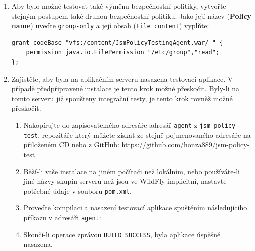 \begin{enumerate}
  \item Aby bylo možné testovat také výměnu bezpečnostní politiky, vytvořte stejným postupem také druhou bezpečnostní politiku. Jako její název ({\bf Policy name}) uveďte {\tt group-only} a její obsah ({\tt File content}) vyplňte:
  \begin{lstlisting}
grant codeBase "vfs:/content/JsmPolicyTestingAgent.war/-" {
    permission java.io.FilePermission "/etc/group","read";
};
  \end{lstlisting}
  \item Zajistěte, aby byla na aplikačním serveru nasazena testovací aplikace. V případě předpřipravené instalace je tento krok možné přeskočit. Byly-li na tomto serveru již spoušteny integrační testy, je tento krok rovněž možné přeskočit.
  \begin{enumerate}
    \item Nakopírujte do zapisovatelného adresáře adresář {\tt agent} z {\tt jsm-policy-test}, repozitáře který můžete získat ze stejně pojmenovaného adresáře na přiloženém CD nebo z GitHub:
      \newline\url{https://github.com/honza889/jsm-policy-test}
    \item Běží-li vaše instalace na jiném počítači než lokálním, nebo používáte-li jiné názvy skupin serverů než jsou ve WildFly implicitní, nastavte potřebné údaje v souboru {\tt pom.xml}.
    \item Proveďte kompilaci a nasazení testovací aplikace spuštěním následujícího příkazu v adresáři {\tt agent}:
    \item Skončí-li operace zprávou {\tt BUILD SUCCESS}, byla aplikace úspěšně nasazena.
  \end{enumerate}
  

\end{enumerate}
